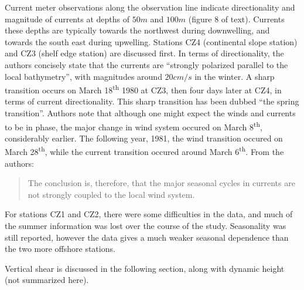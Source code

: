 \documentclass[12pt]{extreport}
\begin{document}
Current meter observations along the observation line indicate directionality and magnitude of currents at depths of $50m$ and $100m$ (figure 8 of text). Currents these depths are typically towards the northwest during downwelling, and towards the south east during upwelling. Stations CZ4 (continental slope station) and CZ3 (shelf edge station) are discussed first. In terms of directionality, the authors concisely state that the currents are ``strongly polarized parallel to the local bathymetry'', with magnitudes around $20cm/s$ in the winter. A sharp transition occurs on March 18\textsuperscript{th} 1980 at CZ3, then four days later at CZ4, in terms of current directionality. This sharp transition has been dubbed ``the spring transition''. Authors note that although one might expect the winds and currents to be in phase, the major change in wind system occured on March 8\textsuperscript{th}, considerably earlier. The following year, 1981, the wind transition occured on March 28\textsuperscript{th}, while the current transition occured around March 6\textsuperscript{th}. From the authors:
\begin{quote}
The conclusion is, therefore, that the major seasonal cycles in currents are not strongly coupled to the local wind system.
\end{quote}

For stations CZ1 and CZ2, there were some difficulties in the data, and much of the summer information was lost over the course of the study. Seasonality was still reported, however the data gives a much weaker seasonal dependence than the two more offshore stations.

Vertical shear is discussed in the following section, along with dynamic height (not summarized here).
\end{document}
